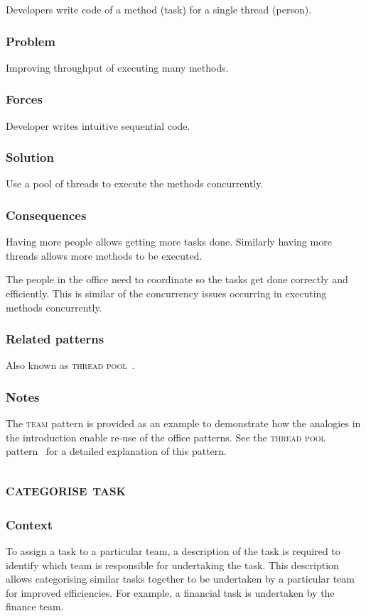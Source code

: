 \documentclass[prodmode]{style/acmlarge}
\begin{document}
Developers write code of a method (task) for a single thread (person).

\subsubsection*{Problem} Improving throughput of executing many methods.

\subsubsection*{Forces} Developer writes intuitive sequential code.

\subsubsection*{Solution} Use a pool of threads to execute the methods
concurrently.

\subsubsection*{Consequences} Having more people allows getting more tasks done.
Similarly having more threads allows more methods to be executed.

The people in the office need to coordinate so the tasks get done correctly and
efficiently.  This is similar of the concurrency issues occurring in executing
methods concurrently.

\subsubsection*{Related patterns} Also known as \textsc{thread pool}~\cite{thread-per-request}.

\subsubsection*{Notes} The \textsc{team} pattern is provided as an example to
demonstrate how the analogies in the introduction enable re-use of the office
patterns. See the \textsc{thread pool} pattern~\cite{thread-per-request} for a
detailed explanation of this pattern.



\subsection{\textsc{\textbf{categorise task}}}

\subsubsection*{Context} To assign a task to a particular team, a description of
the task is required to identify which team is responsible for undertaking the
task.  This description allows categorising similar tasks together to be
undertaken by a particular team for improved efficiencies.  For example, a
financial task is undertaken by the finance team.
\end{document}
